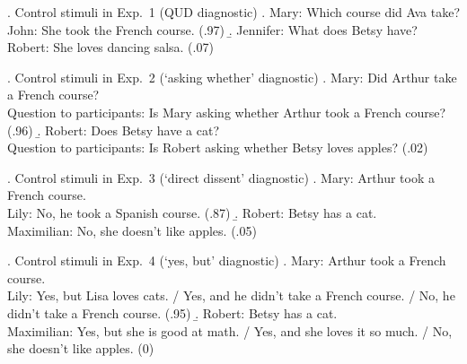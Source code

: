 \documentclass[times,linguex,xcolor]{glossa}
\begin{document}
\ex.\label{control1} Control stimuli in Exp.~1 (QUD diagnostic)
\a. Mary: Which course did Ava take?
\\ John: She took the French course. (.97)
\b. Jennifer: What does Betsy have?
\\ Robert: She loves dancing salsa. (.07)

\ex.\label{control2} Control stimuli in Exp.~2 (`asking whether' diagnostic)
\a. Mary: Did Arthur take a French course?
\\ Question to participants: Is Mary asking whether Arthur took a French course? (.96)
\b. Robert: Does Betsy have a cat?
\\ Question to participants: Is Robert asking whether Betsy loves apples? (.02)

\ex.\label{control3} Control stimuli in Exp.~3 (`direct dissent' diagnostic)
\a. Mary: Arthur took a French course.
\\ Lily: No, he took a Spanish course. (.87)
\b. Robert: Betsy has a cat.
\\ Maximilian: No, she doesn't like apples. (.05)

\ex.\label{control4} Control stimuli in Exp.~4 (`yes, but' diagnostic)
\a. Mary: Arthur took a French course.
\\ Lily: Yes, but Lisa loves cats. / Yes, and he didn't take a French course. / No, he didn't take a French course. (.95)
\b. Robert: Betsy has a cat.
\\ Maximilian: Yes, but she is good at math. / Yes, and she loves it so much. / No, she doesn't like apples. (0)
\end{document}
